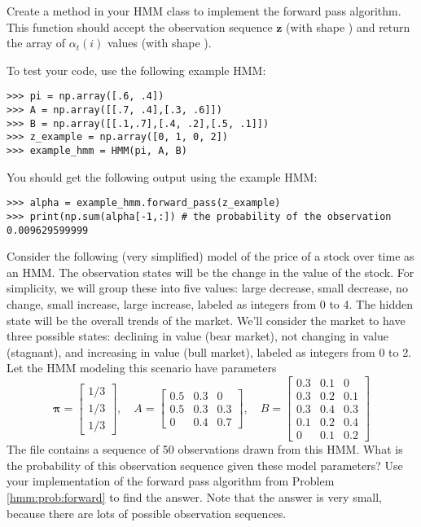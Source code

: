 \begin{problem}\label{hmm:prob:forward}
Create a method  in your HMM class to implement the forward pass algorithm.
This function should accept the observation sequence $\mathbf{z}$ (with shape ) and return the array of $\alpha_t(i)$ values (with shape ).

To test your code, use the following example HMM:
\begin{lstlisting}
>>> pi = np.array([.6, .4])
>>> A = np.array([[.7, .4],[.3, .6]])
>>> B = np.array([[.1,.7],[.4, .2],[.5, .1]])
>>> z_example = np.array([0, 1, 0, 2])
>>> example_hmm = HMM(pi, A, B)
\end{lstlisting}
You should get the following output using the example HMM:
\begin{lstlisting}
>>> alpha = example_hmm.forward_pass(z_example)
>>> print(np.sum(alpha[-1,:]) # the probability of the observation
0.009629599999
\end{lstlisting}
\end{problem}

\begin{problem}\label{hmm:prob:stocks1}
Consider the following (very simplified) model of the price of a stock over time as an HMM.
The observation states will be the change in the value of the stock.
For simplicity, we will group these into five values: large decrease, small decrease, no change, small increase, large increase, labeled as integers from 0 to 4.
The hidden state will be the overall trends of the market.
We'll consider the market to have three possible states: declining in value (bear market), not changing in value (stagnant), and increasing in value (bull market), labeled as integers from 0 to 2.
Let the HMM modeling this scenario have parameters
\[
\boldsymbol\pi=\begin{bmatrix}
1/3 \\ 1/3 \\ 1/3
\end{bmatrix},
\quad
A=\begin{bmatrix}
0.5 & 0.3 & 0 \\
0.5 & 0.3 & 0.3 \\
0 & 0.4 & 0.7
\end{bmatrix},
\quad
B=\begin{bmatrix}
0.3 & 0.1 & 0 \\
0.3 & 0.2 & 0.1 \\
0.3 & 0.4 & 0.3 \\
0.1 & 0.2 & 0.4 \\
0 & 0.1 & 0.2
\end{bmatrix}
\]
The file  contains a sequence of 50 observations drawn from this HMM.
What is the probability of this observation sequence given these model parameters?
Use your implementation of the forward pass algorithm from Problem \ref{hmm:prob:forward} to find the answer.
Note that the answer is very small, because there are lots of possible observation sequences.
\end{problem}

